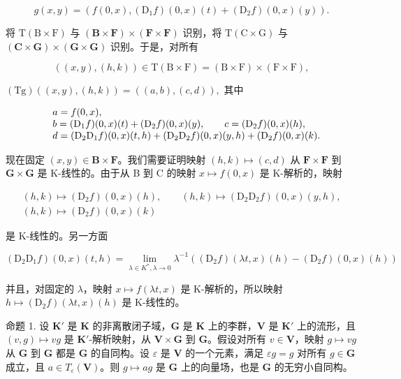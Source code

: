 \[
g (x, y) = \left(f (0, x), \left(\mathrm{D} _ {1} f\right) (0, x) (t) + \left(\mathrm{D} _ {2} f\right) (0, x) (y)\right).
\]

将 \(\mathrm{T(B\times F)}\) 与 \((\mathbf{B}\times \mathbf{F})\times (\mathbf{F}\times \mathbf{F})\) 识别，将 \(\mathrm{T(C\times G)}\) 与 \((\mathbf{C}\times \mathbf{G})\times (\mathbf{G}\times \mathbf{G})\) 识别。于是，对所有

\[
((x, y), (h, k)) \in \mathrm{T} (\mathrm{B} \times \mathrm{F}) = (\mathrm{B} \times \mathrm{F}) \times (\mathrm{F} \times \mathrm{F}),
\]

\((\mathrm{Tg})((x,y),(h,k)) = ((a,b),(c,d)),\) 其中

\[
\begin{array}{r l} & {a = f (0, x),} \\ & {b = (\mathrm{D} _ {1} f) (0, x) (t) + (\mathrm{D} _ {2} f) (0, x) (y), \qquad c = (\mathrm{D} _ {2} f) (0, x) (h),} \\ & {d = (\mathrm{D} _ {2} \mathrm{D} _ {1} f) (0, x) (t, h) + (\mathrm{D} _ {2} \mathrm{D} _ {2} f) (0, x) (y, h) + (\mathrm{D} _ {2} f) (0, x) (k).} \end{array}
\]

现在固定 \((x,y)\in \mathbf{B}\times \mathbf{F}\)。我们需要证明映射 \((h,k)\mapsto (c,d)\) 从 \(\mathbf{F}\times \mathbf{F}\) 到 \(\mathbf{G}\times \mathbf{G}\) 是 K-线性的。由于从 B 到 C 的映射 \(x\mapsto f(0,x)\) 是 K-解析的，映射

\[
\begin{array}{c} (h, k) \mapsto (\mathrm{D} _ {2} f) (0, x) (h), \qquad (h, k) \mapsto (\mathrm{D} _ {2} \mathrm{D} _ {2} f) (0, x) (y, h), \\ (h, k) \mapsto (\mathrm{D} _ {2} f) (0, x) (k) \end{array}
\]

是 K-线性的。另一方面

\[
\left(\mathrm{D} _ {2} \mathrm{D} _ {1} f\right) (0, x) (t, h) = \lim _ {\lambda \in K ^ {*}, \lambda \rightarrow 0} \lambda^ {- 1} \left(\left(\mathrm{D} _ {2} f\right) (\lambda t, x) (h) - \left(\mathrm{D} _ {2} f\right) (0, x) (h)\right)
\]

并且，对固定的 \(\lambda\)，映射 \(x \mapsto f(\lambda t, x)\) 是 K-解析的，所以映射 \(h \mapsto (\mathrm{D}_2f)(\lambda t, x)(h)\) 是 K-线性的。

命题 1. 设 \(\mathbf{K}'\) 是 \(\mathbf{K}\) 的非离散闭子域，\(\mathbf{G}\) 是 \(\mathbf{K}\) 上的李群，\(\mathbf{V}\) 是 \(\mathbf{K}'\) 上的流形，且 \((v, g) \mapsto vg\) 是 \(\mathbf{K}'\)-解析映射，从 \(\mathbf{V} \times \mathbf{G}\) 到 \(\mathbf{G}\)。假设对所有 \(v \in \mathbf{V}\)，映射 \(g \mapsto vg\) 从 \(\mathbf{G}\) 到 \(\mathbf{G}\) 都是 \(\mathbf{G}\) 的自同构。设 \(\varepsilon\) 是 \(\mathbf{V}\) 的一个元素，满足 \(\varepsilon g = g\) 对所有 \(g \in \mathbf{G}\) 成立，且 \(a \in T_{\varepsilon}(\mathbf{V})\)。则 \(g \mapsto ag\) 是 \(\mathbf{G}\) 上的向量场，也是 \(\mathbf{G}\) 的无穷小自同构。

